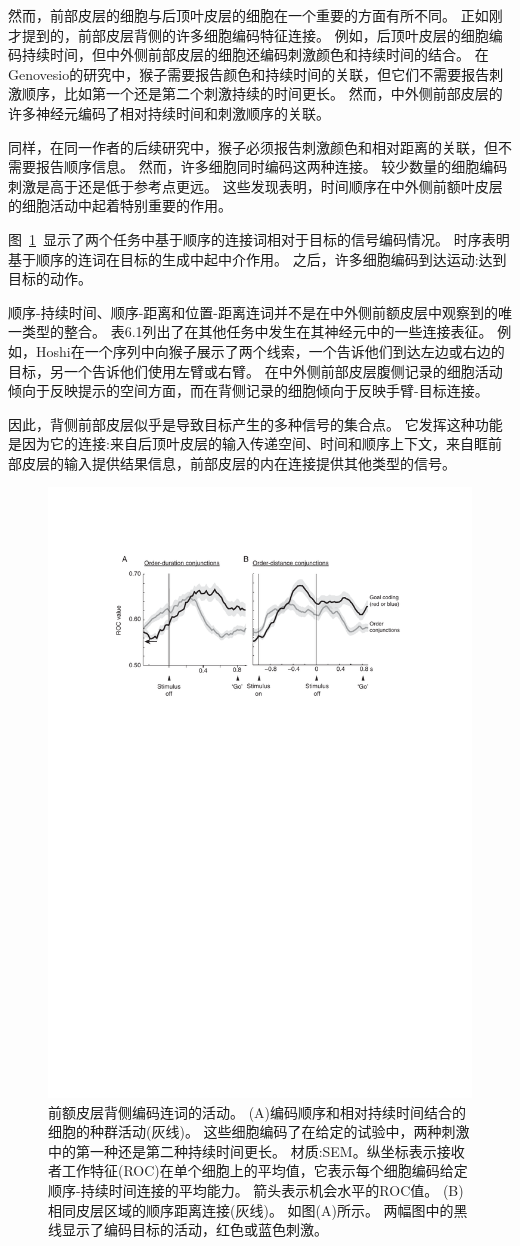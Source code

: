 然而，前部皮层的细胞与后顶叶皮层的细胞在一个重要的方面有所不同。
正如刚才提到的，前部皮层背侧的许多细胞编码特征连接。
例如，后顶叶皮层的细胞编码持续时间，但中外侧前部皮层的细胞还编码刺激颜色和持续时间的结合。
在Genovesio\cite{genovesio2009feature}的研究中，猴子需要报告颜色和持续时间的关联，但它们不需要报告刺激顺序，比如第一个还是第二个刺激持续的时间更长。
然而，中外侧前部皮层的许多神经元编码了相对持续时间和刺激顺序的关联。


同样，在同一作者\cite{genovesio2011prefrontal}的后续研究中，猴子必须报告刺激颜色和相对距离的关联，但不需要报告顺序信息。
然而，许多细胞同时编码这两种连接。
较少数量的细胞编码刺激是高于还是低于参考点更远。
这些发现表明，时间顺序在中外侧前额叶皮层的细胞活动中起着特别重要的作用。


图~\ref{fig:6_14}~显示了两个任务中基于顺序的连接词相对于目标的信号编码情况。
时序表明基于顺序的连词在目标的生成中起中介作用。
之后，许多细胞编码到达运动:达到目标的动作。


顺序-持续时间、顺序-距离和位置-距离连词并不是在中外侧前额皮层中观察到的唯一类型的整合。
表6.1列出了在其他任务中发生在其神经元中的一些连接表征。
例如，Hoshi\cite{hoshi2004area}在一个序列中向猴子展示了两个线索，一个告诉他们到达左边或右边的目标，另一个告诉他们使用左臂或右臂。
在中外侧前部皮层腹侧记录的细胞活动倾向于反映提示的空间方面，而在背侧记录的细胞倾向于反映手臂-目标连接。


因此，背侧前部皮层似乎是导致目标产生的多种信号的集合点。
它发挥这种功能是因为它的连接:来自后顶叶皮层的输入传递空间、时间和顺序上下文，来自眶前部皮层的输入提供结果信息，前部皮层的内在连接提供其他类型的信号。


\begin{figure}
	\centering
	\includegraphics[width=0.5\linewidth]{chap6/6_14}
	\caption{前额皮层背侧编码连词的活动。
		(A)编码顺序和相对持续时间结合的细胞的种群活动(灰线)。
		这些细胞编码了在给定的试验中，两种刺激中的第一种还是第二种持续时间更长。
		材质:SEM。纵坐标表示接收者工作特征(ROC)在单个细胞上的平均值，它表示每个细胞编码给定顺序-持续时间连接的平均能力。
		箭头表示机会水平的ROC值。
		(B)相同皮层区域的顺序距离连接(灰线)。
		如图(A)所示。
		两幅图中的黑线显示了编码目标的活动，红色或蓝色刺激\cite{genovesio2011prefrontal}。}
	\label{fig:6_14}
\end{figure}



